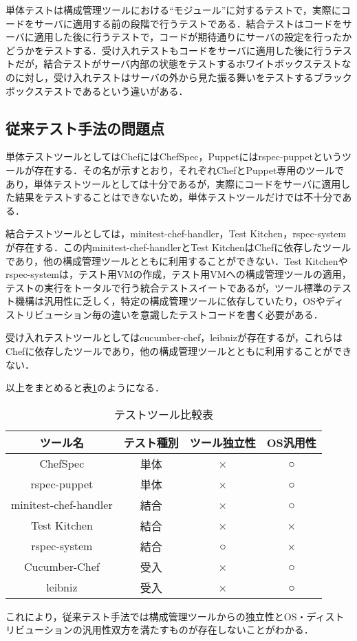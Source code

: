 単体テストは構成管理ツールにおける``モジュール''に対するテストで，実際にコードをサーバに適用する前の段階で行うテストである．結合テストはコードをサーバに適用した後に行うテストで，コードが期待通りにサーバの設定を行ったかどうかをテストする．受け入れテストもコードをサーバに適用した後に行うテストだが，結合テストがサーバ内部の状態をテストするホワイトボックステストなのに対し，受け入れテストはサーバの外から見た振る舞いをテストするブラックボックステストであるという違いがある．

\subsection{従来テスト手法の問題点}

単体テストツールとしてはChefにはChefSpec，Puppetにはrspec-puppetというツールが存在する．その名が示すとおり，それぞれChefとPuppet専用のツールであり，単体テストツールとしては十分であるが，実際にコードをサーバに適用した結果をテストすることはできないため，単体テストツールだけでは不十分である．

結合テストツールとしては，minitest-chef-handler，Test Kitchen，rspec-systemが存在する．この内minitest-chef-handlerとTest KitchenはChefに依存したツールであり，他の構成管理ツールとともに利用することができない．Test Kitchenやrspec-systemは，テスト用VMの作成，テスト用VMへの構成管理ツールの適用，テストの実行をトータルで行う統合テストスイートであるが，ツール標準のテスト機構は汎用性に乏しく，特定の構成管理ツールに依存していたり，OSやディストリビューション毎の違いを意識したテストコードを書く必要がある．

受け入れテストツールとしてはcucumber-chef，leibnizが存在するが，これらはChefに依存したツールであり，他の構成管理ツールとともに利用することができない．

以上をまとめると表\ref{tab:comparison}のようになる．

\begin{table}[htb]
  \begin{center}
    \begin{tabular}{|c|c|c|c|}
      \hline
      ツール名 & テスト種別 & ツール独立性 & OS汎用性 \\
      \hline
      \hline
      ChefSpec              & 単体 & ×  & ○ \\
      \hline
      rspec-puppet          & 単体 & ×  & ○ \\
      \hline
      minitest-chef-handler & 結合 & ×  & ○ \\
      \hline
      Test Kitchen          & 結合 & ×  & × \\
      \hline
      rspec-system          & 結合 & ○ & × \\
      \hline
      Cucumber-Chef         & 受入 & ×  & ○ \\
      \hline
      leibniz               & 受入 & ×  & ○ \\
      \hline
    \end{tabular}
    \label{tab:comparison}
    \caption{テストツール比較表}
  \end{center}
\end{table}

これにより，従来テスト手法では構成管理ツールからの独立性とOS・ディストリビューションの汎用性双方を満たすものが存在しないことがわかる．

